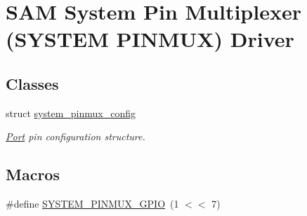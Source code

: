 \hypertarget{group__asfdoc__sam0__system__pinmux__group}{}\section{S\+A\+M System Pin Multiplexer (S\+Y\+S\+T\+E\+M P\+I\+N\+M\+U\+X) Driver}
\label{group__asfdoc__sam0__system__pinmux__group}
\subsection*{Classes}
\begin{DoxyCompactItemize}
\item 
struct \hyperlink{structsystem__pinmux__config}{system\+\_\+pinmux\+\_\+config}
\begin{DoxyCompactList}\small\item\em \hyperlink{struct_port}{Port} pin configuration structure. \end{DoxyCompactList}\end{DoxyCompactItemize}
\subsection*{Macros}
\begin{DoxyCompactItemize}
\item 
\#define \hyperlink{group__asfdoc__sam0__system__pinmux__group_gaf212e7bc2a29cb57ab7b1130e4404a6b}{S\+Y\+S\+T\+E\+M\+\_\+\+P\+I\+N\+M\+U\+X\+\_\+\+G\+P\+I\+O}~(1 $<$$<$ 7)
\end{DoxyCompactItemize}

